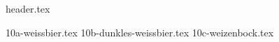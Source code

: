 \clearpage
{}
\divisorLine
{header.tex}
\begin{multicols}{2}
{10a-weissbier.tex}
{10b-dunkles-weissbier.tex}
{10c-weizenbock.tex}
\end{multicols}